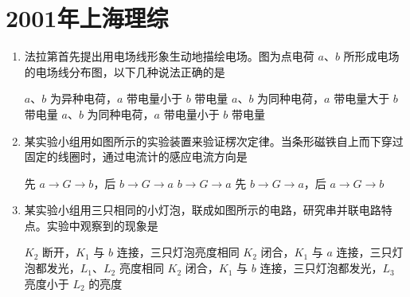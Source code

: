 \documentclass[\gkver]{gaokaozhenti}
\begin{document}
\chapter{2001年上海理综}

\begin{enumerate}
\item
法拉第首先提出用电场线形象生动地描绘电场。图为点电荷 $a$、$b$ 所形成电场的电场线分布图，以下几种说法正确的是


{$a$、$b$ 为异种电荷，$a$ 带电量小于 $b$ 带电量}
{$a$、$b$ 为同种电荷，$a$ 带电量大于 $b$ 带电量}
{$a$、$b$ 为同种电荷，$a$ 带电量小于 $b$ 带电量}


\item
某实验小组用如图所示的实验装置来验证楞次定律。当条形磁铁自上而下穿过固定的线圈时，通过电流计的感应电流方向是


{先 $a\to G\to b$，后 $b\to G\to a$}
{$b\to G\to a$}
{先 $b\to G\to a$，后 $a\to G\to b$}


\item
某实验小组用三只相同的小灯泡，联成如图所示的电路，研究串并联电路特点。实验中观察到的现象是


{$K_{2}$ 断开，$K_{1}$ 与 $b$ 连接，三只灯泡亮度相同}
{$K_{2}$ 闭合，$K_{1}$ 与 $a$ 连接，三只灯泡都发光，$L_{1}$、$L_{2}$ 亮度相同}
{$K_{2}$ 闭合，$K_{1}$ 与 $b$ 连接，三只灯泡都发光，$L_{3}$ 亮度小于 $L_{2}$ 的亮度}


\end{enumerate}
\end{document}
